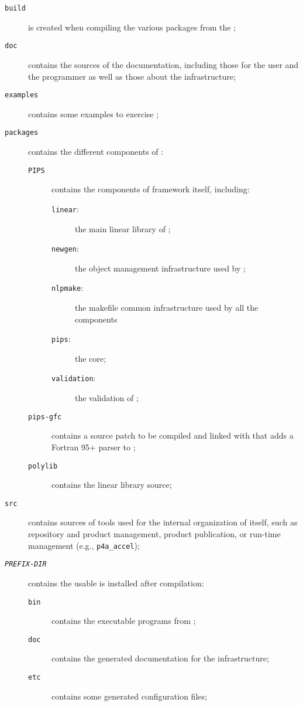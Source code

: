 \documentclass[a4paper]{article}
\begin{document}
\begin{description}
\item[\texttt{build}] is created when compiling the various
  \Apfa packages from the \Aautotools;
\item[\texttt{doc}] contains the sources of the \Apfa documentation,
  including those for the user and the programmer as well as those
  about the infrastructure;
\item[\texttt{examples}] contains some examples to exercise \Apfa;
\item[\texttt{packages}] contains the different components of \Apfa:
  \begin{description}
  \item[\texttt{PIPS}] contains the components of \Apips framework
    itself, including:
    \begin{description}
    \item[\texttt{linear}:] the main linear library of \Apips;
    \item[\texttt{newgen}:] the object management infrastructure used by
      \Apips;
    \item[\texttt{nlpmake}:] the makefile common infrastructure used by
      all the \Apips components
    \item[\texttt{pips}:] the \Apips core;
    \item[\texttt{validation}:] the validation of \Apips;
    \end{description}
  \item[\texttt{pips-gfc}] contains a  source patch to be
    compiled and linked with \Apips that adds a Fortran 95+ parser to \Apips;
  \item[\texttt{polylib}] contains the \Apolylib linear library source;
  \end{description}
\item[\texttt{src}] contains sources of tools used for the internal
  organization of \Apfa itself, such as repository and product management,
  product publication, or run-time management (e.g., \verb|p4a_accel|);
\item[\texttt{\emph{PREFIX-DIR}}] contains the usable \Apfa is installed
  after compilation:
  \begin{description}
  \item[\texttt{bin}] contains the executable programs from \Apfa;
  \item[\texttt{doc}] contains the generated documentation for the \Apfa
    infrastructure;
  \item[\texttt{etc}] contains some generated configuration files;

\end{description}
\end{description}
\end{document}
